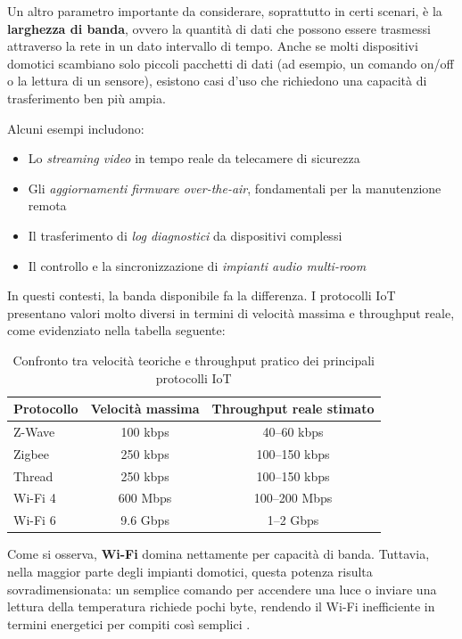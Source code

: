 Un altro parametro importante da considerare, soprattutto in certi scenari, è la \textbf{larghezza di banda}, ovvero la quantità di dati che possono essere trasmessi attraverso la rete in un dato intervallo di tempo. Anche se molti dispositivi domotici scambiano solo piccoli pacchetti di dati (ad esempio, un comando on/off o la lettura di un sensore), esistono casi d’uso che richiedono una capacità di trasferimento ben più ampia.

Alcuni esempi includono:

\begin{itemize}
    \item Lo \textit{streaming video} in tempo reale da telecamere di sicurezza
    \item Gli \textit{aggiornamenti firmware over-the-air}, fondamentali per la manutenzione remota
    \item Il trasferimento di \textit{log diagnostici} da dispositivi complessi
    \item Il controllo e la sincronizzazione di \textit{impianti audio multi-room}
\end{itemize}

In questi contesti, la banda disponibile fa la differenza. I protocolli IoT presentano valori molto diversi in termini di velocità massima e throughput reale, come evidenziato nella tabella seguente:

\begin{table}[h]
\centering
\begin{tabular}{|l|c|c|}
\hline
\textbf{Protocollo} & \textbf{Velocità massima} & \textbf{Throughput reale stimato} \\
\hline
Z-Wave & 100 kbps & 40–60 kbps \\
Zigbee & 250 kbps & 100–150 kbps \\
Thread & 250 kbps & 100–150 kbps \\
Wi-Fi 4 & 600 Mbps & 100–200 Mbps \\
Wi-Fi 6 & 9.6 Gbps & 1–2 Gbps \\
\hline
\end{tabular}
\caption{Confronto tra velocità teoriche e throughput pratico dei principali protocolli IoT}
\end{table}

Come si osserva, \textbf{Wi-Fi} domina nettamente per capacità di banda. Tuttavia, nella maggior parte degli impianti domotici, questa potenza risulta sovradimensionata: un semplice comando per accendere una luce o inviare una lettura della temperatura richiede pochi byte, rendendo il Wi-Fi inefficiente in termini energetici per compiti così semplici \cite{wifi6-spec}. 

